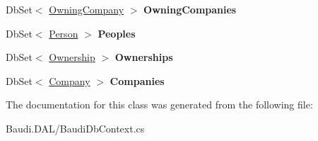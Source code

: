 \begin{DoxyCompactItemize}
\item 
\hypertarget{class_baudi_1_1_d_a_l_1_1_baudi_db_context_a2b9aafe4f8d7b3225cec80260b9bcc14}{}Db\+Set$<$ \hyperlink{class_baudi_1_1_d_a_l_1_1_models_1_1_owning_company}{Owning\+Company} $>$ {\bfseries Owning\+Companies}\label{class_baudi_1_1_d_a_l_1_1_baudi_db_context_a2b9aafe4f8d7b3225cec80260b9bcc14}

\item 
\hypertarget{class_baudi_1_1_d_a_l_1_1_baudi_db_context_a9b213056238700bcfa8ec0f85ecd63ad}{}Db\+Set$<$ \hyperlink{class_baudi_1_1_d_a_l_1_1_models_1_1_person}{Person} $>$ {\bfseries Peoples}\label{class_baudi_1_1_d_a_l_1_1_baudi_db_context_a9b213056238700bcfa8ec0f85ecd63ad}

\item 
\hypertarget{class_baudi_1_1_d_a_l_1_1_baudi_db_context_a59651e59f642a78b289fcc0fc0c54fdb}{}Db\+Set$<$ \hyperlink{class_baudi_1_1_d_a_l_1_1_models_1_1_ownership}{Ownership} $>$ {\bfseries Ownerships}\label{class_baudi_1_1_d_a_l_1_1_baudi_db_context_a59651e59f642a78b289fcc0fc0c54fdb}

\item 
\hypertarget{class_baudi_1_1_d_a_l_1_1_baudi_db_context_a8b52588b390fffa05c7fdf57bd930bdd}{}Db\+Set$<$ \hyperlink{class_baudi_1_1_d_a_l_1_1_models_1_1_company}{Company} $>$ {\bfseries Companies}\label{class_baudi_1_1_d_a_l_1_1_baudi_db_context_a8b52588b390fffa05c7fdf57bd930bdd}

\end{DoxyCompactItemize}


The documentation for this class was generated from the following file\+:\begin{DoxyCompactItemize}
\item 
Baudi.\+D\+A\+L/Baudi\+Db\+Context.\+cs\end{DoxyCompactItemize}
